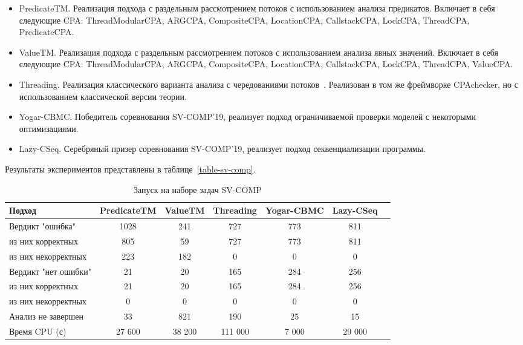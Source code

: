 \begin{itemize}
\item PredicateTM. Реализация подхода с раздельным рассмотрением потоков с использованием анализа предикатов. 
Включает в себя следующие CPA: ThreadModularCPA, ARGCPA, CompositeCPA, LocationCPA, CallstackCPA, LockCPA, ThreadCPA, PredicateCPA.
\item ValueTM. Реализация подхода с раздельным рассмотрением потоков с использованием анализа явных значений. 
Включает в себя следующие CPA: ThreadModularCPA, ARGCPA, CompositeCPA, LocationCPA, CallstackCPA, LockCPA, ThreadCPA, ValueCPA.
\item Threading. Реализация классического варианта анализа с чередованиями потоков~\cite{MEMICS16-Multi-Threaded}. 
Реализован в том же фреймворке CPAchecker, но с использованием классической версии теории.
\item Yogar-CBMC. Победитель соревнования SV-COMP'19, реализует подход ограничиваемой проверки моделей с некоторыми оптимизациями.
\item Lazy-CSeq. Серебряный призер соревнования SV-COMP'19, реализует подход секвенциализации программы.
\end{itemize}

Результаты экспериментов представлены в таблице~\ref{table-sv-comp}.

\begin{center}
  \begin{table}[h]\footnotesize \centering
  	\label{table-sv-comp-tools}
    \caption{Запуск на наборе задач SV-COMP}
    \begin{tabular}{ | l | c | c | c | c | c | c |}
      \hline
      Подход         				& PredicateTM   & ValueTM 	& Threading & Yogar-CBMC 	& Lazy-CSeq  \\ \hline
      Вердикт "ошибка" 				& 1028    		& 241       & 727      	& 773       	& 811       \\ 
  \hspace{0.5cm} из них корректных 	& 805 			& 59 		& 727      	& 773       	& 811       \\ 
  \hspace{0.5cm} из них некорректных & 223 			& 182 		& 0    		& 0       		& 0          \\ \hline
      Вердикт "нет ошибки"  		& 21      		& 20        & 165       & 284        	& 256     \\ 
  \hspace{0.5cm} из них корректных 	& 21 			& 20    	& 165       & 284        	& 256       \\
  \hspace{0.5cm} из них некорректных & 0 			& 0    		& 0       	& 0         	& 0        \\ \hline
      Анализ не завершен       		& 33     		& 821       & 190      	& 25        	& 15      \\ \hline
      Время CPU (с)   				& 27 600 		& 38 200    & 111 000  	& 7 000    		& 29 000    \\ 
      \hline
    \end{tabular}
  \end{table}
\end{center}

